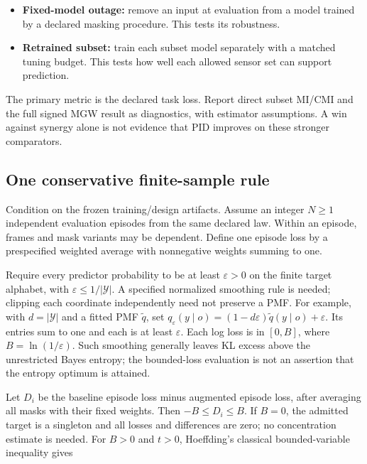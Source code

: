 \documentclass[11pt,a4paper]{article}
\providecommand{\tightlist}{\setlength{\itemsep}{0pt}\setlength{\parskip}{0pt}}
\begin{document}
\begin{itemize}
\tightlist
\item
  \textbf{Fixed-model outage:} remove an input at evaluation from a model trained by a declared masking procedure. This tests its robustness.
\item
  \textbf{Retrained subset:} train each subset model separately with a matched tuning budget. This tests how well each allowed sensor set can support prediction.
\end{itemize}

The primary metric is the declared task loss. Report direct subset MI/CMI and the full signed MGW result as diagnostics, with estimator assumptions. A win against synergy alone is not evidence that PID improves on these stronger comparators.

\par{}

\subsection{One conservative finite-sample rule}\label{one-conservative-finite-sample-rule}

Condition on the frozen training/design artifacts. Assume an integer \(N\geq1\) independent evaluation episodes from the same declared law. Within an episode, frames and mask variants may be dependent. Define one episode loss by a prespecified weighted average with nonnegative weights summing to one.

Require every predictor probability to be at least \(\varepsilon>0\) on the finite target alphabet, with \(\varepsilon\leq1/|\mathcal Y|\). A specified normalized smoothing rule is needed; clipping each coordinate independently need not preserve a PMF. For example, with \(d=|\mathcal Y|\) and a fitted PMF \(\widetilde q\), set \(q_\varepsilon(y\mid o)=(1-d\varepsilon)\widetilde q(y\mid o)+\varepsilon\). Its entries sum to one and each is at least \(\varepsilon\). Each log loss is in \([0,B]\), where \(B=\ln(1/\varepsilon)\). Such smoothing generally leaves KL excess above the unrestricted Bayes entropy; the bounded-loss evaluation is not an assertion that the entropy optimum is attained.

Let \(D_i\) be the baseline episode loss minus augmented episode loss, after averaging all masks with their fixed weights. Then \(-B\leq D_i\leq B\). If \(B=0\), the admitted target is a singleton and all losses and differences are zero; no concentration estimate is needed. For \(B>0\) and \(t>0\), Hoeffding's classical bounded-variable inequality gives
\end{document}

